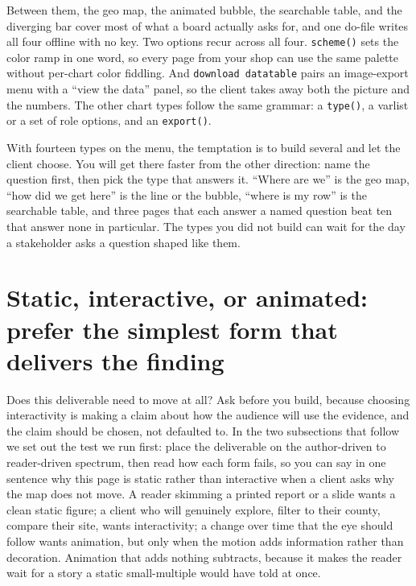 \documentclass[
    a4paper,
    fontsize=10pt,
    twoside=true,
    numbers=noenddot,
]{kaobook}
\begin{document}
Between them, the geo map, the animated bubble, the searchable table, and the diverging bar cover most of what a board actually asks for, and one do-file writes all four offline with no key. Two options recur across all four. \texttt{scheme()} sets the color ramp in one word, so every page from your shop can use the same palette without per-chart color fiddling. And \texttt{download datatable} pairs an image-export menu with a \enquote{view the data} panel, so the client takes away both the picture and the numbers. The other chart types follow the same grammar: a \texttt{type()}, a varlist or a set of role options, and an \texttt{export()}.

With fourteen types on the menu, the temptation is to build several and let the client choose. You will get there faster from the other direction: name the question first, then pick the type that answers it. \enquote{Where are we} is the geo map, \enquote{how did we get here} is the line or the bubble, \enquote{where is my row} is the searchable table, and three pages that each answer a named question beat ten that answer none in particular. The types you did not build can wait for the day a stakeholder asks a question shaped like them.

\section{Static, interactive, or animated: prefer the simplest form that delivers the finding}
Does this deliverable need to move at all? Ask before you build, because choosing interactivity is making a claim about how the audience will use the evidence, and the claim should be chosen, not defaulted to. In the two subsections that follow we set out the test we run first: place the deliverable on the author-driven to reader-driven spectrum, then read how each form fails, so you can say in one sentence why this page is static rather than interactive when a client asks why the map does not move. A reader skimming a printed report or a slide wants a clean static figure; a client who will genuinely explore, filter to their county, compare their site, wants interactivity; a change over time that the eye should follow wants animation, but only when the motion adds information rather than decoration. Animation that adds nothing subtracts, because it makes the reader wait for a story a static small-multiple would have told at once.
\end{document}
